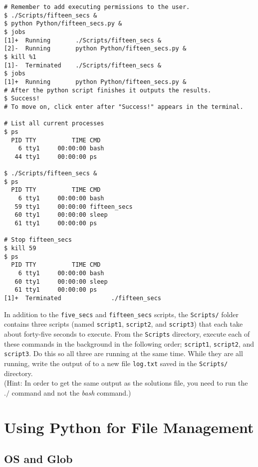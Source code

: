 \begin{lstlisting}
# Remember to add executing permissions to the user.
$ ./Scripts/fifteen_secs &
$ python Python/fifteen_secs.py &
$ jobs
[1]+  Running       ./Scripts/fifteen_secs &
[2]-  Running       python Python/fifteen_secs.py &
$ kill %1
[1]-  Terminated    ./Scripts/fifteen_secs &
$ jobs
[1]+  Running       python Python/fifteen_secs.py &
# After the python script finishes it outputs the results.
$ Success!
# To move on, click enter after "Success!" appears in the terminal.

# List all current processes
$ ps
  PID TTY          TIME CMD
    6 tty1     00:00:00 bash
   44 tty1     00:00:00 ps
   
$ ./Scripts/fifteen_secs &
$ ps
  PID TTY          TIME CMD
    6 tty1     00:00:00 bash
   59 tty1     00:00:00 fifteen_secs
   60 tty1     00:00:00 sleep
   61 tty1     00:00:00 ps

# Stop fifteen_secs   
$ kill 59
$ ps
  PID TTY          TIME CMD
    6 tty1     00:00:00 bash
   60 tty1     00:00:00 sleep
   61 tty1     00:00:00 ps
[1]+  Terminated              ./fifteen_secs
\end{lstlisting}

\begin{problem}
In addition to the \texttt{five\_secs} and \texttt{fifteen\_secs} scripts, the \texttt{Scripts/} folder contains three scripts (named \texttt{script1}, \texttt{script2}, and \texttt{script3}) that each take about forty-five seconds to execute.
From the \texttt{Scripts} directory, execute each of these commands in the background in the following order; \texttt{script1}, \texttt{script2}, and \texttt{script3}.
Do this so all three are running at the same time.
While they are all running, write the output of  to a new file \texttt{log.txt} saved in the \texttt{Scripts/} directory.
\\(Hint: In order to get the same output as the solutions file, you need to run the $./$ command and not the \emph{bash} command.)
\end{problem}

\section*{Using Python for File Management} %

\subsection*{OS and Glob} %

